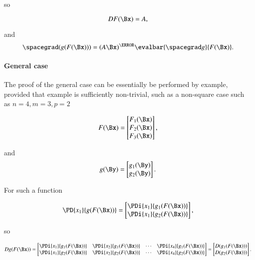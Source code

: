 so

\begin{dmath}\label{eqn:jacobianAndHessian:824}
D F(\Bx) = A,
\end{dmath}

and
\begin{dmath}\label{eqn:jacobianAndHessian:1064}
\spacegrad (g(F(\Bx)))
=
(A \Bx)^\T
\evalbar{\spacegrad g}{F(\Bx)}.
\end{dmath}

\paragraph{General case}

The proof of the general case
can be essentially be performed by example, provided that example is sufficiently non-trivial, such as
a non-square case such as \( n = 4, m = 3, p = 2 \)

\begin{dmath}\label{eqn:jacobianAndHessian:924}
F(\Bx) =
\begin{bmatrix}
F_1(\Bx) \\
F_2(\Bx) \\
F_3(\Bx) \\
\end{bmatrix},
\end{dmath}

and
\begin{dmath}\label{eqn:jacobianAndHessian:944}
g(\By)
=
\begin{bmatrix}
g_1(\By) \\
g_2(\By) \\
\end{bmatrix}.
\end{dmath}

For such a function

\begin{dmath}\label{eqn:jacobianAndHessian:964}
\PD{x_1}{g(F(\Bx))}
=
\begin{bmatrix}
\PDi{x_1}{g_1(F(\Bx))} \\
\PDi{x_1}{g_2(F(\Bx))}
\end{bmatrix},
\end{dmath}

so

\begin{dmath}\label{eqn:jacobianAndHessian:984}
D g(F(\Bx))
=
\begin{bmatrix}
\PDi{x_1}{g_1(F(\Bx))} & \PDi{x_2}{g_1(F(\Bx))} & \cdots & \PDi{x_4}{g_1(F(\Bx))} \\
\PDi{x_1}{g_2(F(\Bx))} & \PDi{x_2}{g_2(F(\Bx))} & \cdots & \PDi{x_4}{g_2(F(\Bx))} \\
\end{bmatrix}
=
\begin{bmatrix}
D (g_1(F(\Bx))) \\
D (g_2(F(\Bx))) \\
\end{bmatrix}.
\end{dmath}

